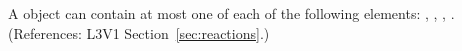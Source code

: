A \Reaction object can contain at most one of each of the following
elements: , ,
, .  (References: L3V1
Section~\ref{sec:reactions}.)
